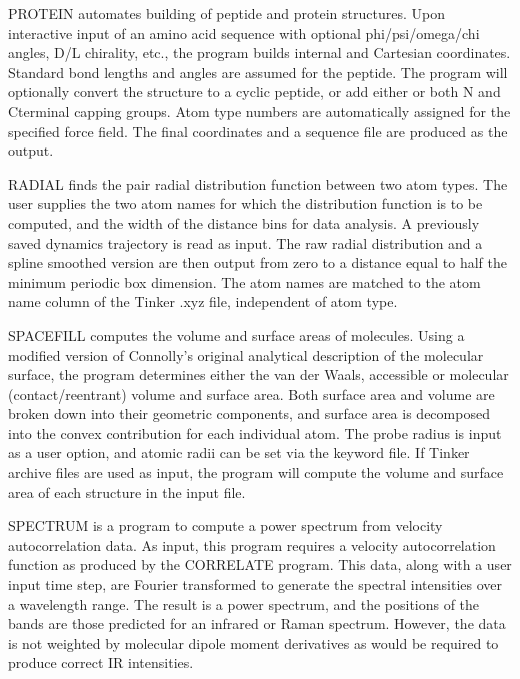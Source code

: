\documentclass[letterpaper,11pt,english]{sphinxmanual}
\begin{document}
\sphinxAtStartPar
{}

\sphinxAtStartPar
PROTEIN automates building of peptide and protein structures. Upon interactive input of an amino acid sequence with optional phi/psi/omega/chi angles, D/L chirality, etc., the program builds internal and Cartesian coordinates. Standard bond lengths and angles are assumed for the peptide. The program will optionally convert the structure to a cyclic peptide, or add either or both N\sphinxhyphen{} and C\sphinxhyphen{}terminal capping groups. Atom type numbers are automatically assigned for the specified force field. The final coordinates and a sequence file are produced as the output.

\sphinxAtStartPar
{}

\sphinxAtStartPar
RADIAL finds the pair radial distribution function between two atom types. The user supplies the two atom names for which the distribution function is to be computed, and the width of the distance bins for data analysis. A previously saved dynamics trajectory is read as input. The raw radial distribution and a spline smoothed version are then output from zero to a distance equal to half the minimum periodic box dimension. The atom names are matched to the atom name column of the Tinker .xyz file, independent of atom type.

\sphinxAtStartPar
{}

\sphinxAtStartPar
SPACEFILL computes the volume and surface areas of molecules. Using a modified version of Connolly’s original analytical description of the molecular surface, the program determines either the van der Waals, accessible or molecular (contact/reentrant) volume and surface area. Both surface area and volume are broken down into their geometric components, and surface area is decomposed into the convex contribution for each individual atom. The probe radius is input as a user option, and atomic radii can be set via the keyword file. If Tinker archive files are used as input, the program will compute the volume and surface area of each structure in the input file.

\sphinxAtStartPar
{}

\sphinxAtStartPar
SPECTRUM is a program to compute a power spectrum from velocity autocorrelation data. As input, this program requires a velocity autocorrelation function as produced by the CORRELATE program. This data, along with a user input time step, are Fourier transformed to generate the spectral intensities over a wavelength range. The result is a power spectrum, and the positions of the bands are those predicted for an infrared or Raman spectrum. However, the data is not weighted by molecular dipole moment derivatives as would be required to produce correct IR intensities.
\end{document}
